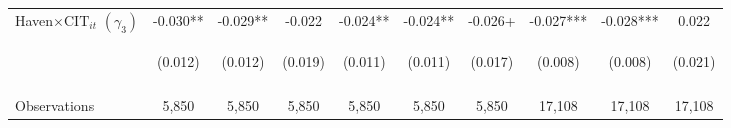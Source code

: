 \begin{center}
\begin{tabular}{lccccccccc}
Haven$\times\text{CIT}_{it}$ $ (\gamma_3)$ & -0.030** & -0.029** & -0.022 & -0.024** & -0.024** & -0.026+ & -0.027*** & -0.028*** & 0.022 \\
 & \begin{footnotesize}(0.012)\end{footnotesize} & \begin{footnotesize}(0.012)\end{footnotesize} & \begin{footnotesize}(0.019)\end{footnotesize} & \begin{footnotesize}(0.011)\end{footnotesize} & \begin{footnotesize}(0.011)\end{footnotesize} & \begin{footnotesize}(0.017)\end{footnotesize} & \begin{footnotesize}(0.008)\end{footnotesize} & \begin{footnotesize}(0.008)\end{footnotesize} & \begin{footnotesize}(0.021)\end{footnotesize} \\
\vspace{4pt} & \begin{footnotesize}\end{footnotesize} & \begin{footnotesize}\end{footnotesize} & \begin{footnotesize}\end{footnotesize} & \begin{footnotesize}\end{footnotesize} & \begin{footnotesize}\end{footnotesize} & \begin{footnotesize}\end{footnotesize} & \begin{footnotesize}\end{footnotesize} & \begin{footnotesize}\end{footnotesize} & \begin{footnotesize}\end{footnotesize} \\
Observations & 5,850 & 5,850 & 5,850 & 5,850 & 5,850 & 5,850 & 17,108 & 17,108 & 17,108 \\

\end{tabular}
\end{center}
